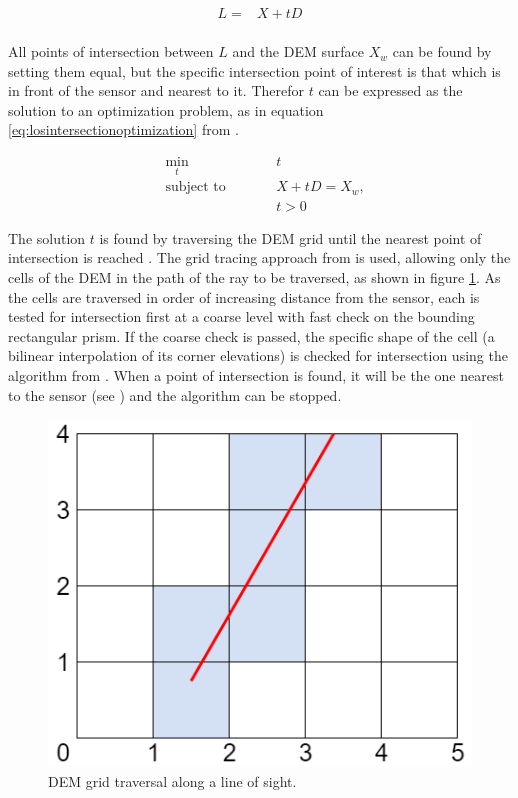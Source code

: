 \documentclass[journal]{IEEEtran}
\begin{document}
\begin{equation}
\begin{aligned}
    L = {}& X + tD \\
\end{aligned} \label{eq:lineofsight}
\end{equation}

All points of intersection between $L$ and the DEM surface $X_w$ can be found by setting them equal, but the specific intersection point of interest is that which is in front of the sensor and nearest to it. Therefor $t$ can be expressed as the solution to an optimization problem, as in equation \ref{eq:losintersectionoptimization} from \cite{schonborn2022terrain}.

\begin{subequations}\label{eq:losintersectionoptimization}
\begin{alignat}{2}
&\!\min_{t}          &\qquad& t\\
&\text{subject to} &      & X + t D = X_w,\\
&                  &      & t > 0
\end{alignat}
\end{subequations}

The solution $t$ is found by traversing the DEM grid until the nearest point of intersection is reached \cite{schonborn2022terrain}. The grid tracing approach from \cite{musgrave1988grid} is used, allowing only the cells of the DEM in the path of the ray to be traversed, as shown in figure \ref{fig:gridintersection}. As the cells are traversed in order of increasing distance from the sensor, each is tested for intersection first at a coarse level with fast check on the bounding rectangular prism. If the coarse check is passed, the specific shape of the cell (a bilinear interpolation of its corner elevations) is checked for intersection using the algorithm from \cite{ramsey2004ray}. When a point of intersection is found, it will be the one nearest to the sensor (see \cite{ramsey2004ray}) and the algorithm can be stopped.

\begin{figure}[ht]
    \centering
    \includegraphics[scale=0.25]{LineGrid.png}
    \caption{DEM grid traversal along a line of sight.}
    \label{fig:gridintersection}
\end{figure}
\end{document}
